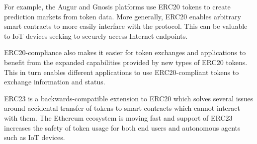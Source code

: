 For example, the Augur and Gnosis platforms use ERC20 tokens to create prediction markets from token data. More generally, ERC20 enables arbitrary smart contracts to more easily interface with the \orchid{} protocol. This can be valuable to IoT devices seeking to securely access Internet endpoints.

ERC20-compliance also makes it easier for token exchanges and applications to benefit from the expanded capabilities provided by new types of ERC20 tokens. This in turn enables different applications to use ERC20-compliant tokens to exchange information and status.

ERC23\cite{41} is a backwards-compatible extension to ERC20 which solves several issues around accidental transfer of tokens to smart contracts which cannot interact with them. The Ethereum ecosystem is moving fast and support of ERC23 increases the safety of \orchid{} token usage for both end users and autonomous agents such as IoT devices.

